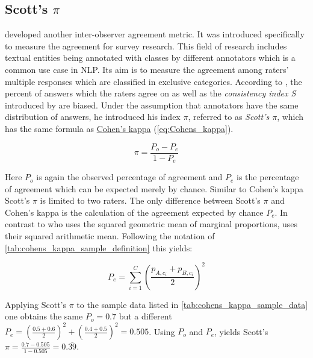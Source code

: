 \subsection[Scott's Pi]{Scott's $\pi$}
\label{chp:fundamentals:sec:inter_rater_agreement:subsec:scotts_pi}
\textcite{Scott:1955} developed another inter-observer agreement metric.
It was introduced specifically to measure the agreement for survey research.
This field of research includes textual entities being annotated with classes by different annotators which is a common use case in \ac{NLP}.
Its aim is to measure the agreement among raters' multiple responses which are classified in exclusive categories.
According to \textcite{Scott:1955}, the percent of answers which the raters agree on as well as the \textit{consistency index S} introduced by \textcite{Bennett:1954} are biased.
Under the assumption that annotators have the same distribution of answers, he introduced his index $\pi$, referred to as \textit{Scott's $\pi$}, which has the same formula as \hyperref[chp:fundamentals:sec:inter_rater_agreement:subsec:cohens_kappa]{Cohen's kappa} (\cref{eq:Cohens_kappa}).

\begin{equation}\label{eq:Scotts_pi}
    \pi = \frac{P_o - P_e}{1 - P_e}
\end{equation}

Here $P_o$ is again the observed percentage of agreement and $P_e$ is the percentage of agreement which can be expected merely by chance.
Similar to Cohen's kappa Scott's $\pi$ is limited to two raters.
The only difference between Scott's $\pi$ and Cohen's kappa is the calculation of the agreement expected by chance $P_e$.
In contrast to \textcite{Cohen:1960} who uses the squared geometric mean of marginal proportions, \textcite{Scott:1955} uses their squared arithmetic mean.
Following the notation of \cref{tab:cohens_kappa_sample_definition} this yields:

\begin{equation}\label{eq:Scotts_pi:p_e}
    P_e = \sum_{i=1}^{C} (\frac{p_{A, c_i} + p_{B, c_i}}{2})^2
\end{equation}

Applying Scott's $\pi$ to the sample data listed in \cref{tab:cohens_kappa_sample_data} one obtains the same $P_o=0.7$ but a different $P_e = (\frac{0.5 + 0.6}{2})^2 + (\frac{0.4+0.5}{2})^2 = 0.505$.
Using $P_o$ and $P_e$, yields Scott's $\pi = \frac{0.7 - 0.505}{1-0.505} = 0.\overline{39}$.
